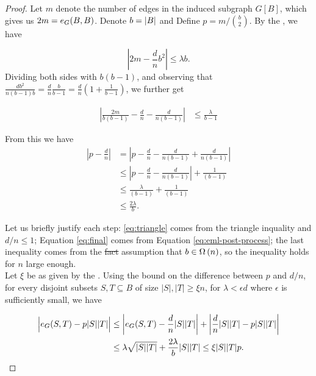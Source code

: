 \documentclass[11pt]{article}
\providecommand{\DIFadd}[1]{\textcolor{shin-ryoku}{#1}}%
\providecommand{\DIFdel}[1]{\textcolor{verylightgray}{\sout{#1}}}                      %
\providecommand{\DIFaddbegin}{} %
\providecommand{\DIFaddend}{} %
\providecommand{\DIFdelbegin}{} %
\providecommand{\DIFdelend}{} %
\begin{document}
\begin{proof}
  Let $m$ denote the number of edges in the induced subgraph $G[B]$, which gives us $2m = \CutEdges{B}{B}{G}$.
Denote $b \Def \Size{B}$ and Define $p = m / \binom{b}{2}$. By the , we have

\[ \left| 2m - \frac{d}{n}b^2 \right| \le \lambda b. \]
Dividing both sides with $b(b-1)$, and observing that $\frac{db^2}{n(b-1)b} = \frac{d}{n}\frac{b}{b-1} = \frac{d}{n}(1 + \frac{1}{b-1})$, we further get

\begin{align}
\left| \frac{2m}{b(b-1)} - \frac{d}{n} - \frac{d}{n(b-1)} \right| &\le \frac{\lambda}{b-1}  \label{eq:eml-post-process}
\end{align}

From this we have 
\begin{align}
  \left| p - \frac{d}{n}\right| &= \left| p - \frac{d}{n} - \frac{d}{n(b-1)} + \frac{d}{n(b-1)}\right|  \\
                                &\le \left| p - \frac{d}{n} - \frac{d}{n(b-1)} \right| + \frac{1}{(b-1)} \label{eq:triangle}\\
                                &\le \frac{\lambda}{(b-1)} + \frac{1}{(b-1)}  \label{eq:final} \\
  & \le \frac{2\lambda}{b}. 
\end{align}

Let us briefly justify each step: \eqref{eq:triangle} comes from the triangle inquality and  $d/n \le 1$;
Equation \eqref{eq:final} comes from Equation \eqref{eq:eml-post-process};
the last inequality comes from the \DIFdelbegin \DIFdel{fact }\DIFdelend \DIFaddbegin \DIFadd{assumption }\DIFaddend that $b \in \BigOmega{n}$, so the inequality holds for $n$ large enough.\\

Let $\xi$ be as given by \DIFaddbegin \DIFadd{the }\DIFaddend {}. Using the bound on the difference between $p$ and $d/n$, for every disjoint subsets $S, T \subseteq B$ of size $|S|,|T| \ge \xi n$, for $\lambda < \epsilon d$ where $\epsilon$ is sufficiently small, we have

\begin{align*}
  \Bigl| \CutEdges{S}{T}{G}  - p|S||T| \Bigr| &\le \left| \CutEdges{S}{T}{G} - \frac{d}{n}|S||T| \right| + \left| \frac{d}{n}|S||T| - p|S||T| \right| \\
                                    &\le \lambda \sqrt{|S||T|} + \frac{2 \lambda}{b} |S||T| \le \xi |S||T|p. 
    \end{align*}


\end{proof}
\end{document}
